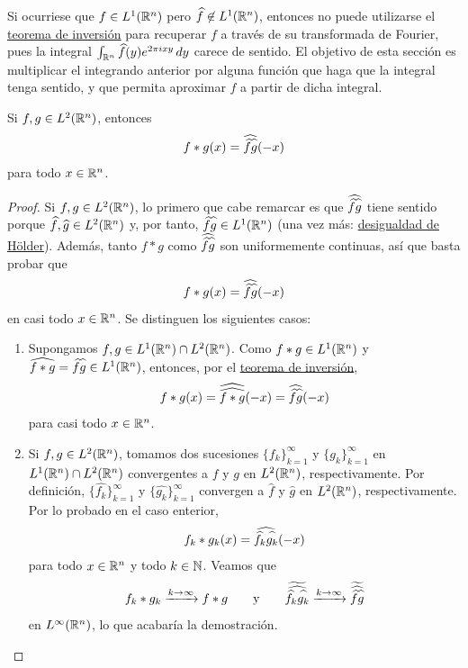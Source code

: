 \documentclass[a4paper, 11pt, oneside]{report}
\begin{document}
Si ocurriese que $f \in L^1(\mathbb R^n)$ pero $\widehat{f} \not\in L^1(\mathbb R^n)$, entonces no puede utilizarse el \hyperref[teo:3.2.3]{\color{c1}teorema de inversión} para recuperar $f$ a través de su transformada de Fourier, pues la integral $\int_{\mathbb R^n}\widehat{f}(y)e^{2\pi i xy} \, dy$ carece de sentido. El objetivo de esta sección es multiplicar el integrando anterior por alguna función que haga que la integral tenga sentido, y que permita aproximar $f$ a partir de dicha integral.

\begin{proposition}
  Si $f,g \in L^2(\mathbb R^n)$, entonces
  \[f \ast g(x) = \widehat{\widehat{f}\widehat{\vphantom{f} g}} (-x)\]
  para todo $x \in \mathbb R^n$.
\end{proposition}

\begin{proof}
  Si $f,g \in L^2(\mathbb R^n)$, lo primero que cabe remarcar es que $\widehat{\widehat{f}\widehat{\vphantom{f}g}} $ tiene sentido porque $\widehat{f}, \widehat{g} \in L^2(\mathbb R^n)$ y, por tanto, $\widehat{f}\widehat{\vphantom{f}g} \in L^1(\mathbb R^n)$ (una vez más: \hyperref[cor:1.4.4]{\color{c1}desigualdad de Hölder}). Además, tanto $f \ast g$ como $\widehat{\widehat{f}\widehat{\vphantom{f}g}} $ son uniformemente continuas, así que basta probar que 
  \[f \ast g(x) = \widehat{\widehat{f}\widehat{\vphantom{f} g}} (-x)\]
  en casi todo $x \in \mathbb R^n$. Se distinguen los siguientes casos:
  \begin{enumerate}
    \item Supongamos $f,g \in L^1(\mathbb R^n) \cap L^2(\mathbb R^n)$. Como $f \ast g \in L^1(\mathbb R^n)$ y $\widehat{f \ast g} = \widehat{f}\widehat{\vphantom{f}g} \in L^1(\mathbb R^n)$, entonces, por el \hyperref[teo:3.2.3]{\color{c1}teorema de inversión},
    \[f \ast g(x) = \widehat{\widehat{f \ast g}} (-x) = \widehat{\widehat{f}\widehat{\vphantom{f} g}}(-x)\]
    para casi todo $x \in \mathbb R^n$.
    \item Si $f,g\in L^2(\mathbb R^n)$, tomamos dos sucesiones $\{f_k\}_{k=1}^\infty$ y $\{g_k\}_{k=1}^\infty$ en $L^1(\mathbb R^n) \cap L^2(\mathbb R^n)$ convergentes a $f$ y $g$ en $L^2(\mathbb R^n)$, respectivamente. Por definición, $\{\widehat{f_k}\}_{k=1}^\infty$ y $\{\widehat{g_k}\}_{k=1}^\infty$ convergen a $\widehat{f}$ y $\widehat{g}$ en $L^2(\mathbb R^n)$, respectivamente. Por lo probado en el caso enterior,
    \[f_k \ast g_k(x) = \widehat{\widehat{f_k}\widehat{\vphantom{f}g_k}}(-x)\]
    para todo $x \in \mathbb R^n$ y todo $k \in \mathbb N$. Veamos que
    \[f_k \ast g_k \xrightarrow{k \to \infty} f \ast g \qquad \textup{y} \qquad \widetilde{\widehat{\widehat{f_k}\widehat{\vphantom{f}g_k}}} \xrightarrow{k \to \infty} \widetilde{\widehat{\widehat{f}\widehat{\vphantom{f}g}}}\]
    en $L^\infty(\mathbb R^n)$, lo que acabaría la demostración. 
    

\end{enumerate}
\end{proof}
\end{document}
